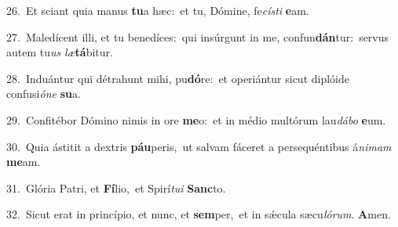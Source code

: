 {\numbfont\textcolor{\numbcolor}{26.}}~Et sciant quia manus \textbf{tu}\-a hæc:~\star et tu, Dómine, fe\-\textit{cís}\-\textit{ti} \textbf{e}\-am.\par
{\numbfont\textcolor{\numbcolor}{27.}}~Maledícent illi, et tu benedíces:~\dagger qui insúrgunt in me, confun\-\textbf{dán}\-tur:~\star servus autem tu\textit{us} \textit{læ}\-\textbf{tá}bitur.\par
{\numbfont\textcolor{\numbcolor}{28.}}~Induántur qui détrahunt mihi, pu\-\textbf{dó}\-re:~\star et operiántur sicut diplóide confusi\-\textit{ó}\-\textit{ne} \textbf{su}\-a.\par
{\numbfont\textcolor{\numbcolor}{29.}}~Confitébor Dómino nimis in ore \textbf{me}\-o:~\star et in médio multórum lau\-\textit{dá}\-\textit{bo} \textbf{e}\-um.\par
{\numbfont\textcolor{\numbcolor}{30.}}~Quia ástitit a dextris \textbf{páu}\-peris,~\star ut salvam fáceret a persequéntibus á\-\textit{ni}\-\textit{mam} \textbf{me}\-am.\par
{\numbfont\textcolor{\numbcolor}{31.}}~Glória Patri, et \textbf{Fí}\-lio,~\star et Spirí\-\textit{tu}\-\textit{i} \textbf{Sanc}\-to.\par
{\numbfont\textcolor{\numbcolor}{32.}}~Sicut erat in princípio, et nunc, et \textbf{sem}\-per,~\star et in sǽcula sæcu\-\textit{ló}\-\textit{rum}. \textbf{A}\-men.\par

